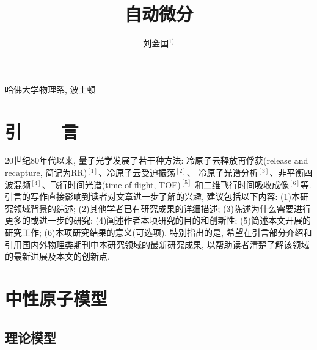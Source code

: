 \documentclass[A4,twoside,fontset=ubuntu,UTF8]{ctexart}
\begin{document}
\apsname

\title{自动微分 \fivestar}%

\author{刘金国$^{1)}$}

\address{1)}{哈佛大学物理系, 波士顿 }









\section{引~~~~言}


20世纪80年代以来, 量子光学发展了若干种方法: 冷原子云释放再俘获(release and
recapture, 简记为RR)$^{[1]}$、冷原子云受迫振荡$^{[2]}$、 冷原子光谱分析$^{[3]}$、非平衡四波混频$^{[4]}$、飞行时间光谱(time
of flight, TOF)$^{[5]}$ 和二维飞行时间吸收成像$^{[6]}$等. 引言的写作直接影响到读者对文章进一步了解的兴趣, 建议包括以下内容:
(1)本研究领域背景的综述; (2)其他学者已有研究成果的详细描述;
(3)陈述为什么需要进行更多的或进一步的研究;
(4)阐述作者本项研究的目的和创新性; (5)简述本文开展的研究工作;
(6)本项研究结果的意义(可选项). 特别指出的是, 希望在引言部分介绍和引用国内外物理类期刊中本研究领域的最新研究成果, 以帮助读者清楚了解该领域的最新进展及本文的创新点.

\section{中性原子模型}

\subsection{理论模型}
\end{document}
